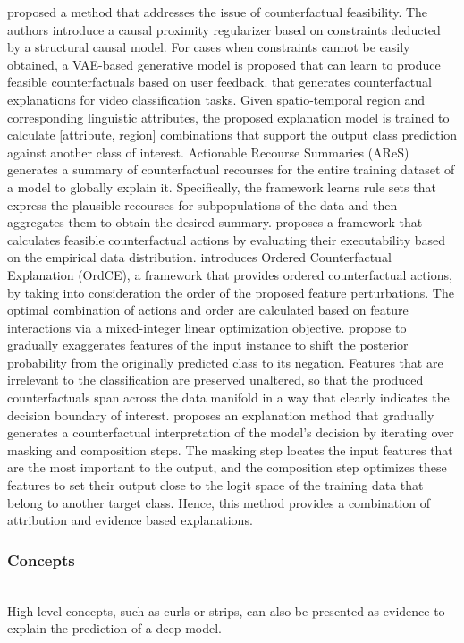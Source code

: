 \documentclass[journal]{IEEEtran}
\begin{document}
\cite{Mahajan2019} proposed a method that addresses the issue of counterfactual feasibility. The authors introduce a causal proximity regularizer based on constraints deducted by a structural causal model. For cases when constraints cannot be easily obtained, a VAE-based generative model is proposed that can learn to produce feasible counterfactuals based on user feedback.
\cite{Kanehira2019b} that generates counterfactual explanations for video classification tasks. Given spatio-temporal region and corresponding linguistic attributes, the proposed explanation model is trained to calculate [attribute, region] combinations that support the output class prediction against another class of interest.
Actionable Recourse Summaries (AReS) \cite{Rawal2020} generates a summary of counterfactual recourses for the entire training dataset of a model to globally explain it. Specifically, the framework learns rule sets that express the plausible recourses for subpopulations of the data and then aggregates them to obtain the desired summary.
\cite{Kanamori2020b} proposes a framework that calculates feasible counterfactual actions by evaluating their executability based on the empirical data distribution.
\cite{Kanamori2021} introduces Ordered Counterfactual Explanation (OrdCE), a framework that provides ordered counterfactual actions, by taking into consideration the order of the proposed feature perturbations. The optimal combination of actions and order are calculated based on feature interactions via a mixed-integer linear optimization objective.
\cite{Pollack2020} propose to gradually exaggerates features of the input instance to shift the posterior probability from the originally predicted class to its negation. Features that are irrelevant to the classification are preserved unaltered, so that the produced counterfactuals span across the data manifold in a way that clearly indicates the decision boundary of interest.
\cite{Kang2020} proposes an explanation method that gradually generates a counterfactual interpretation of the model's decision by iterating over masking and composition steps. The masking step locates the input features that are the most important to the output, and the composition step optimizes these features to set their output close to the logit space of the training data that belong to another target class. Hence, this method provides a combination of attribution and evidence based explanations.

\subsubsection{Concepts}
\hfill\\
High-level concepts, such as curls or strips, can also be presented as evidence to explain the prediction of a deep model.
\end{document}
